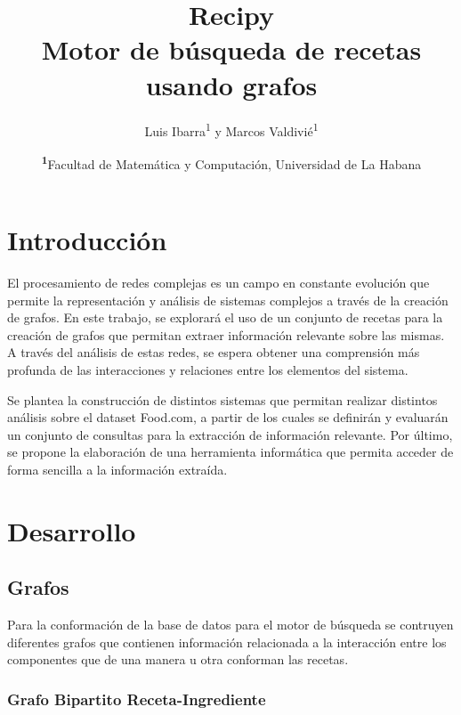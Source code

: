 \documentclass[
	a4paper, %
	10pt, %
	unnumberedsections, %
	twoside, %
]{LTJournalArticle}
\title{Recipy\\Motor de búsqueda de recetas usando grafos} %
\author{%
	Luis Ibarra\textsuperscript{1} y Marcos Valdivié\textsuperscript{1} 
}
\date{\footnotesize\textsuperscript{\textbf{1}}Facultad de Matemática y Computación, Universidad de La Habana}
\begin{document}
\maketitle %


\section{Introducción}

El procesamiento de redes complejas es un campo en constante evolución que permite la representación y análisis de sistemas complejos a través de la creación de grafos. En este trabajo, se explorará el uso de un conjunto de recetas para la creación de grafos que permitan extraer información relevante sobre las mismas. A través del análisis de estas redes, se espera obtener una comprensión más profunda de las interacciones y relaciones entre los elementos del sistema. 

Se plantea la construcción de distintos sistemas que permitan realizar distintos análisis sobre el dataset Food.com, a partir de los cuales se definirán y evaluarán un conjunto de consultas para la extracción de información relevante. Por último, se propone la elaboración de una herramienta informática que permita acceder de forma sencilla a la información extraída.



\section{Desarrollo}

\subsection{Grafos}

Para la conformación de la base de datos para el motor de búsqueda se contruyen diferentes grafos que
contienen información relacionada a la interacción entre los componentes que de una manera u otra conforman
las recetas.

\subsubsection{Grafo Bipartito Receta-Ingrediente}
\end{document}
